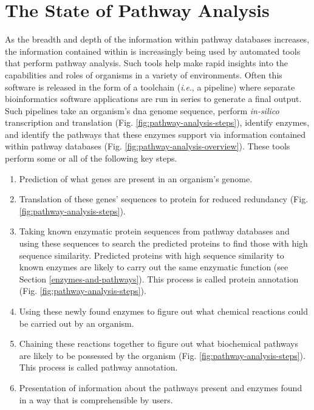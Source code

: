 \section{The State of Pathway Analysis}

As the breadth and depth of the information within pathway databases increases, 
the information contained within is increasingly being used by automated tools 
that perform pathway analysis. Such tools help make rapid insights into the 
capabilities and roles of organisms in a variety of environments. Often this 
software is released in the form of a toolchain (\textit{i}.\textit{e}., a 
pipeline) where separate bioinformatics software applications are run in series 
to generate a final output. Such pipelines take an organism's \gls{dna} genome 
sequence, perform \textit{in-silico} transcription and translation (Fig. 
\ref{fig:pathway-analysis-steps}), identify enzymes, and identify the pathways 
that these enzymes support via information contained within pathway databases (Fig. 
\ref{fig:pathway-analysis-overview}). These tools perform some or all of the 
following key steps.

\begin{enumerate}
\item Prediction of what genes are present in an organism's genome.
\item Translation of these genes' sequences to protein for reduced redundancy 
(Fig. \ref{fig:pathway-analysis-steps}).
\item Taking known enzymatic protein sequences from pathway databases and using 
these sequences to search the predicted proteins to find those with high 
sequence similarity. Predicted proteins with high sequence similarity to known 
enzymes are likely to carry out the same enzymatic function (see Section 
\ref{enzymes-and-pathways}). This process is called protein annotation (Fig. 
\ref{fig:pathway-analysis-steps}).
\item Using these newly found enzymes to figure out what chemical reactions 
could be carried out by an organism.
\item Chaining these reactions together to figure out what biochemical pathways 
are likely to be possessed by the organism (Fig. 
\ref{fig:pathway-analysis-steps}). This process is called pathway annotation.
\item Presentation of information about the pathways present and enzymes found 
in a way that is comprehensible by users.
\end{enumerate}

